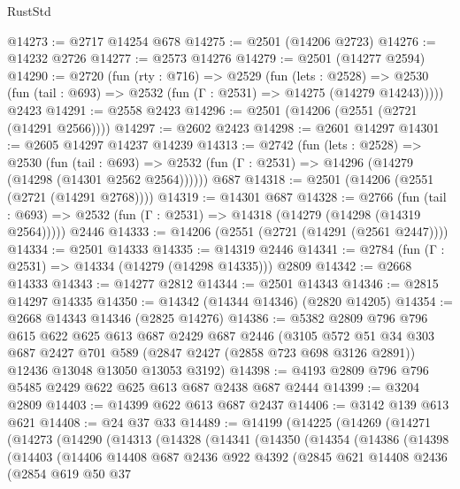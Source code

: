 \begin{lexlean}{RustStd}
\begin{coremodule}
{\begin{coremodule}
{{{{{{{{{{{{{{{{{{{{@14273 := @2717 @14254 @678
@14275 := @2501 (@14206 @2723)
@14276 := @14232 @2726
@14277 := @2573 @14276
@14279 := @2501 (@14277 @2594)
@14290 := @2720
    (fun (rty : @716) =>
    @2529
      (fun (lets : @2528) =>
      @2530 (fun (tail : @693) => @2532 (fun (Γ : @2531) => @14275 (@14279 @14243)))))
    @2423
@14291 := @2558 @2423
@14296 := @2501 (@14206 (@2551 (@2721 (@14291 @2566))))
@14297 := @2602 @2423
@14298 := @2601 @14297
@14301 := @2605 @14297 @14237 @14239
@14313 := @2742
    (fun (lets : @2528) =>
    @2530
      (fun (tail : @693) =>
      @2532 (fun (Γ : @2531) => @14296 (@14279 (@14298 (@14301 @2562 @2564))))))
    @687
@14318 := @2501 (@14206 (@2551 (@2721 (@14291 @2768))))
@14319 := @14301 @687
@14328 := @2766
    (fun (tail : @693) => @2532 (fun (Γ : @2531) => @14318 (@14279 (@14298 (@14319 @2564)))))
    @2446
@14333 := @14206 (@2551 (@2721 (@14291 (@2561 @2447))))
@14334 := @2501 @14333
@14335 := @14319 @2446
@14341 := @2784 (fun (Γ : @2531) => @14334 (@14279 (@14298 @14335))) @2809
@14342 := @2668 @14333
@14343 := @14277 @2812
@14344 := @2501 @14343
@14346 := @2815 @14297 @14335
@14350 := @14342 (@14344 @14346) (@2820 @14205)
@14354 := @2668 @14343 @14346 (@2825 @14276)
@14386 := @5382
    @2809
    @796
    @796
    @615
    @622
    @625
    @613
    @687
    @2429
    @687
    @2446
    (@3105
      @572
      @51
      @34
      @303
      @687
      @2427
      @701
      @589
      (@2847 @2427 (@2858 @723 @698 @3126 @2891))
      @12436
      @13048
      @13050
      @13053
      @3192)
@14398 := @4193 @2809 @796 @796 @5485 @2429 @622 @625 @613 @687 @2438 @687 @2444
@14399 := @3204 @2809
@14403 := @14399 @622 @613 @687 @2437
@14406 := @3142 @139 @613 @621
@14408 := @24 @37 @33
@14489 := @14199
    (@14225
      (@14269
        (@14271
          (@14273
            (@14290
              (@14313
                (@14328
                  (@14341
                    (@14350
                      (@14354
                        (@14386
                          (@14398
                            (@14403
                              (@14406
                                @14408
                                @687
                                @2436
                                @922
                                @4392
                                (@2845
                                  @621
                                  @14408
                                  @2436
                                  (@2854
                                    @619
                                    @50
                                    @37
}}}}}}}}}}}}}}}}}}}}
\end{coremodule}}
\end{coremodule}
\end{lexlean}
